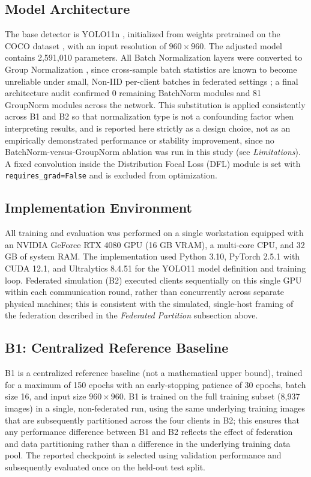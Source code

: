 \documentclass[11pt]{article}
\begin{document}
\subsection{Model Architecture}
The base detector is YOLO11n \cite{jocher2024}, initialized from weights pretrained on the COCO dataset \cite{lin2014coco}, with an input resolution of $960\times960$. The adjusted model contains 2,591,010 parameters. All Batch Normalization layers were converted to Group Normalization \cite{wu2018groupnorm}, since cross-sample batch statistics are known to become unreliable under small, Non-IID per-client batches in federated settings \cite{li2021fedbn}; a final architecture audit confirmed 0 remaining BatchNorm modules and 81 GroupNorm modules across the network. This substitution is applied consistently across B1 and B2 so that normalization type is not a confounding factor when interpreting results, and is reported here strictly as a design choice, not as an empirically demonstrated performance or stability improvement, since no BatchNorm-versus-GroupNorm ablation was run in this study (see \emph{Limitations}). A fixed convolution inside the Distribution Focal Loss (DFL) module is set with \texttt{requires\_grad=False} and is excluded from optimization.

\subsection{Implementation Environment}
All training and evaluation was performed on a single workstation equipped with an NVIDIA GeForce RTX 4080 GPU (16 GB VRAM), a multi-core CPU, and 32 GB of system RAM. The implementation used Python 3.10, PyTorch 2.5.1 with CUDA 12.1, and Ultralytics 8.4.51 for the YOLO11 model definition and training loop. Federated simulation (B2) executed clients sequentially on this single GPU within each communication round, rather than concurrently across separate physical machines; this is consistent with the simulated, single-host framing of the federation described in the \emph{Federated Partition} subsection above.

\subsection{B1: Centralized Reference Baseline}
B1 is a centralized reference baseline (not a mathematical upper bound), trained for a maximum of 150 epochs with an early-stopping patience of 30 epochs, batch size 16, and input size $960\times960$. B1 is trained on the full training subset (8,937 images) in a single, non-federated run, using the same underlying training images that are subsequently partitioned across the four clients in B2; this ensures that any performance difference between B1 and B2 reflects the effect of federation and data partitioning rather than a difference in the underlying training data pool. The reported checkpoint is selected using validation performance and subsequently evaluated once on the held-out test split.
\end{document}
